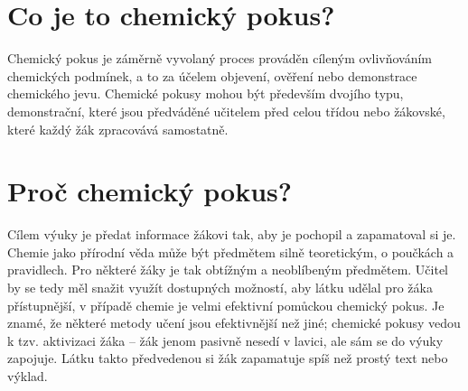\section{Co je to chemický pokus?}
Chemický pokus je záměrně vyvolaný proces prováděn cíleným ovlivňováním chemických podmínek, a to za účelem objevení, ověření nebo demonstrace chemického jevu.\cite{badani} Chemické pokusy mohou být především dvojího typu, demonstrační, které jsou předváděné učitelem před celou třídou nebo žákovské, které každý žák zpracovává samostatně.

\section{Proč chemický pokus?}
Cílem výuky je předat informace žákovi tak, aby je pochopil a zapamatoval si je. Chemie jako přírodní věda může být předmětem silně teoretickým, o poučkách a pravidlech. Pro některé žáky je tak obtížným a neoblíbeným předmětem.\cite{oblibenost} Učitel by se tedy měl snažit využít dostupných možností, aby látku udělal pro žáka přístupnější, v případě chemie je velmi efektivní pomůckou chemický pokus. Je znamé, že některé metody učení jsou efektivnější než jiné; chemické pokusy vedou k tzv. aktivizaci žáka -- žák jenom pasivně nesedí v lavici, ale sám se do výuky zapojuje. Látku takto předvedenou si žák zapamatuje spíš než prostý text nebo výklad.\cite{badani}
